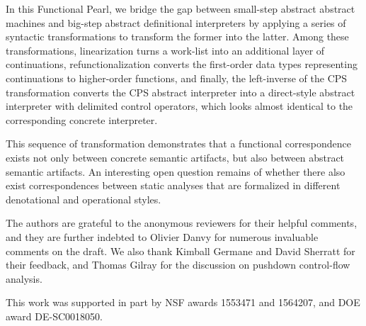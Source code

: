 \documentclass[acmsmall, screen]{acmart}\settopmatter{}
\begin{document}

In this Functional Pearl, we bridge the gap between small-step abstract abstract machines
and big-step abstract definitional interpreters by applying a series of syntactic
transformations to transform the former into the latter. Among these transformations,
linearization turns a work-list into an additional layer of continuations, refunctionalization
converts the first-order data types representing continuations to higher-order functions,
and finally, the left-inverse of the CPS transformation converts the CPS abstract interpreter
into a direct-style abstract interpreter with delimited control operators, which looks almost
identical to the corresponding concrete interpreter.

This sequence of transformation demonstrates that a functional correspondence exists
not only between concrete semantic artifacts, but also between abstract semantic artifacts.
An interesting open question remains of whether there also exist
correspondences between static analyses that are formalized in different
denotational and operational styles.

\begin{acks}                            %
  The authors are grateful to the anonymous reviewers for their
  helpful comments, and they are further indebted to Olivier Danvy
  for numerous invaluable comments on the draft. We also thank
  Kimball Germane and David Sherratt for their feedback, and
  Thomas Gilray for the discussion on pushdown control-flow analysis.

  This work was supported in part by 
  NSF awards 1553471 and 1564207, and DOE award DE-SC0018050.
\end{acks}




\end{document}
